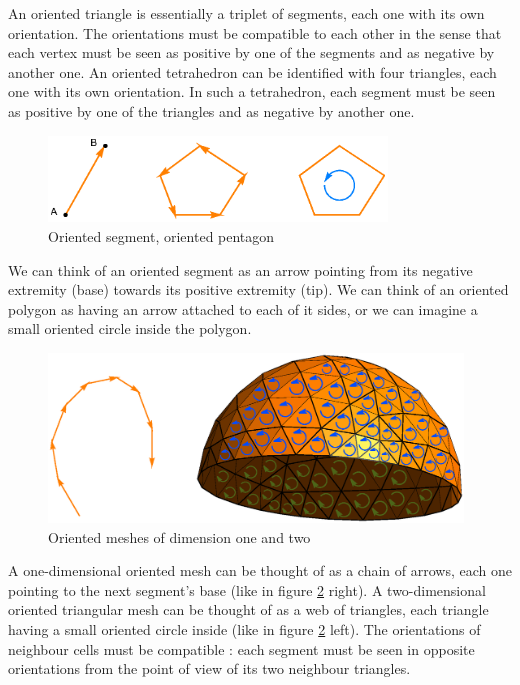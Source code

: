 An oriented triangle is essentially a triplet of segments, each one with its own orientation.
The orientations must be compatible to each other in the sense that each vertex 
must be seen as positive by one of the segments and as negative by another one.
An oriented tetrahedron can be identified with four triangles, each one with its own
orientation.
In such a tetrahedron, each segment must be seen as positive by one of the triangles and
as negative by another one.

\begin{figure}[ht] \centering
  \includegraphics[width=90mm]{oriented-cells.eps}
  \caption{Oriented segment, oriented pentagon}
  \label{\numb section 1.\numb fig 2}
\end{figure}

We can think of an oriented segment as an arrow pointing from its negative extremity (base)
towards its positive extremity (tip).
We can think of an oriented polygon as having an arrow attached to each of it sides,
or we can imagine a small oriented circle inside the polygon.

\begin{figure} \centering
  \includegraphics[width=110mm]{hemisphere-7}
  \caption{Oriented meshes of dimension one and two}
  \label{\numb section 1.\numb fig 3}
\end{figure}

A one-dimensional oriented mesh can be thought of as a chain of arrows,
each one pointing to the next segment's base (like in figure \ref{\numb section 1.\numb fig 3}
right).
A two-dimensional oriented triangular mesh can be thought of as a web of triangles,
each triangle having a small oriented circle inside (like in figure
\ref{\numb section 1.\numb fig 3} left).
The orientations of neighbour cells must be compatible : each segment must be seen
in opposite orientations from the point of view of its two neighbour triangles.

